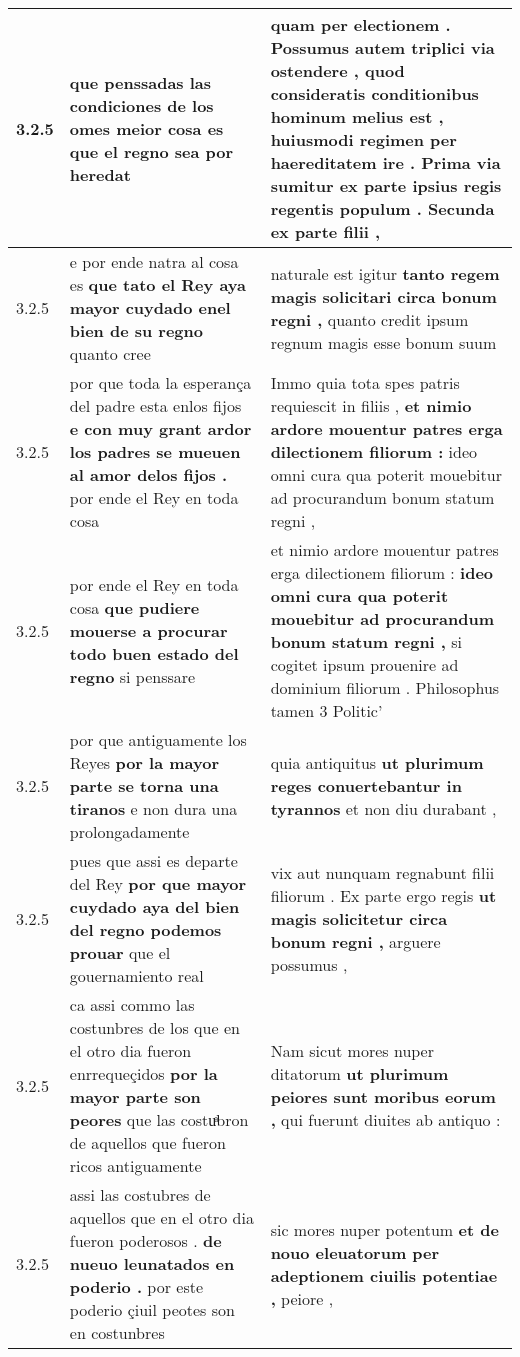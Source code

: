 \begin{tabular}{|p{1cm}|p{6.5cm}|p{6.5cm}|}
3.2.5 & que penssadas las condiciones de los omes \textbf{ meior cosa es } que el regno sea por heredat & quam per electionem . Possumus autem triplici via ostendere , \textbf{ quod consideratis conditionibus hominum melius est , } huiusmodi regimen per haereditatem ire . Prima via sumitur ex parte ipsius regis regentis populum . Secunda ex parte filii , \\\hline
3.2.5 & e por ende natra al cosa es \textbf{ que tato el Rey aya mayor cuydado enel bien de su regno } quanto cree & naturale est igitur \textbf{ tanto regem magis solicitari circa bonum regni , } quanto credit ipsum regnum magis esse bonum suum \\\hline
3.2.5 & por que toda la esperança del padre esta enlos fijos \textbf{ e con muy grant ardor los padres se mueuen al amor delos fijos . } por ende el Rey en toda cosa & Immo quia tota spes patris requiescit in filiis , \textbf{ et nimio ardore mouentur patres erga dilectionem filiorum : } ideo omni cura qua poterit mouebitur ad procurandum bonum statum regni , \\\hline
3.2.5 & por ende el Rey en toda cosa \textbf{ que pudiere mouerse a procurar todo buen estado del regno } si penssare & et nimio ardore mouentur patres erga dilectionem filiorum : \textbf{ ideo omni cura qua poterit mouebitur ad procurandum bonum statum regni , } si cogitet ipsum prouenire ad dominium filiorum . Philosophus tamen 3 Politic’ \\\hline
3.2.5 & por que antiguamente los Reyes \textbf{ por la mayor parte se torna una tiranos } e non dura una prolongadamente & quia antiquitus \textbf{ ut plurimum reges conuertebantur in tyrannos } et non diu durabant , \\\hline
3.2.5 & pues que assi es departe del Rey \textbf{ por que mayor cuydado aya del bien del regno podemos prouar } que el gouernamiento real & vix aut nunquam regnabunt filii filiorum . Ex parte ergo regis \textbf{ ut magis solicitetur circa bonum regni , } arguere possumus , \\\hline
3.2.5 & ca assi commo las costunbres de los que en el otro dia fueron enrrequeçidos \textbf{ por la mayor parte son peores } que las costuͣbron de aquellos que fueron ricos antiguamente & Nam sicut mores nuper ditatorum \textbf{ ut plurimum peiores sunt moribus eorum , } qui fuerunt diuites ab antiquo : \\\hline
3.2.5 & assi las costubres de aquellos que en el otro dia fueron poderosos . \textbf{ de nueuo leunatados en poderio . } por este poderio çiuil peotes son en costunbres & sic mores nuper potentum \textbf{ et de nouo eleuatorum per adeptionem ciuilis potentiae , } peiore , \\\hline

\end{tabular}
